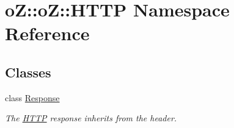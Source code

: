 \hypertarget{namespaceo_z_1_1o_z_1_1_h_t_t_p}{}\section{oZ\+::oZ\+::H\+T\+TP Namespace Reference}
\label{namespaceo_z_1_1o_z_1_1_h_t_t_p}
\subsection*{Classes}
\begin{DoxyCompactItemize}
\item 
class \mbox{\hyperlink{classo_z_1_1o_z_1_1_h_t_t_p_1_1_response}{Response}}
\begin{DoxyCompactList}\small\item\em The \mbox{\hyperlink{namespaceo_z_1_1o_z_1_1_h_t_t_p}{H\+T\+TP}} response inherits from the header. \end{DoxyCompactList}\end{DoxyCompactItemize}
